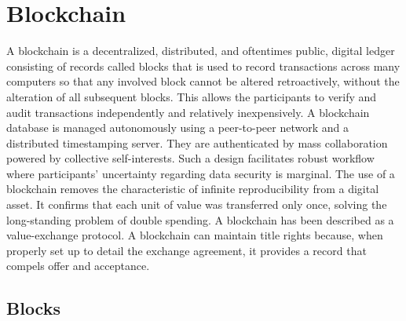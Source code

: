 \section{Blockchain}

A blockchain is a decentralized, distributed, and oftentimes public, digital
ledger consisting of records called blocks that is used to record transactions
across many computers so that any involved block cannot be altered
retroactively, without the alteration of all subsequent blocks. This allows the
participants to verify and audit transactions independently and relatively
inexpensively. A blockchain database is managed autonomously using a
peer-to-peer network and a distributed timestamping server. They are
authenticated by mass collaboration powered by collective self-interests. Such
a design facilitates robust workflow where participants' uncertainty regarding
data security is marginal. The use of a blockchain removes the characteristic
of infinite reproducibility from a digital asset. It confirms that each unit of
value was transferred only once, solving the long-standing problem of double
spending. A blockchain has been described as a value-exchange protocol. A
blockchain can maintain title rights because, when properly set up to detail
the exchange agreement, it provides a record that compels offer and acceptance.

\subsection{Blocks}


